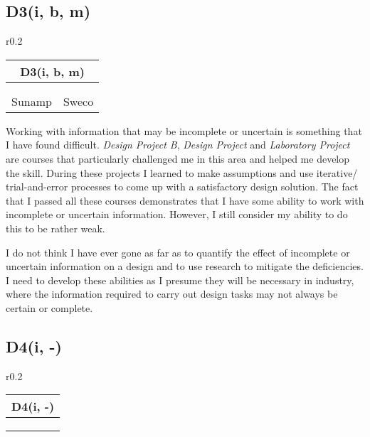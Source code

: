 \subsection*{D3(i, b, m)}

\begin{wraptable}{r}{0.2\textwidth}
	\begin{tabular}{|ll|}
		\hline
		\multicolumn{2}{|c|}{\cellcolor[HTML]{F8A102}\textbf{D3(i, b, m) \littlemaster}} \\ \hline
		\DPB & \PRJ \\
		\LAB &  \\
		Sunamp & Sweco \\ \hline
	\end{tabular}
\end{wraptable}

Working with information that may be incomplete or uncertain is something that I have found difficult.
\textit{Design Project B}, \textit{Design Project} and \textit{Laboratory Project} are courses that particularly challenged me in this area and helped me develop the skill.
During these projects I learned to make assumptions and use iterative/ trial-and-error processes to come up with a satisfactory design solution.
The fact that I passed all these courses demonstrates that I have some ability to work with incomplete or uncertain information.
However, I still consider my ability to do this to be rather weak.

I do not think I have ever gone as far as to quantify the effect of incomplete or uncertain information on a design and to use research to mitigate the deficiencies.
I need to develop these abilities as I presume they will be necessary in industry, where the information required to carry out design tasks may not always be certain or complete.








\subsection*{D4(i, -)}

\begin{wraptable}{r}{0.2\textwidth}
	\begin{tabular}{|ll|}
		\hline
		\multicolumn{2}{|c|}{\cellcolor[HTML]{F8A102}\textbf{D4(i, -) \nomaster}} \\ \hline
		\DPA & \DPB \\
		\CAS & \EnBldgs \\
		\PRJ &  \\ \hline
	\end{tabular}
\end{wraptable}

